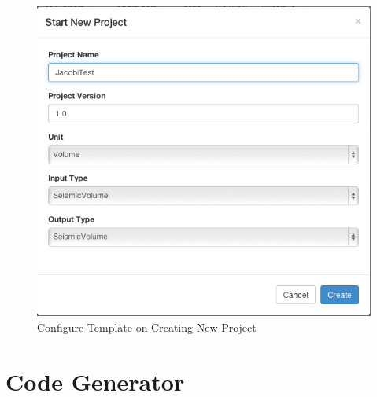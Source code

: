 \begin{figure}[H]
\centering
\includegraphics[scale=.50]{figures/NewProject.png}
\caption{Configure Template on Creating New Project}
\label{NewProject}
\end{figure}


\section{Code Generator}


